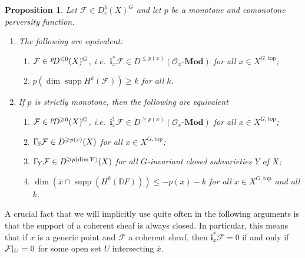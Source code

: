 \documentclass{compositio}
\theoremstyle{plain}
\newtheorem{Prop}[Thm]{Proposition}
\theoremstyle{definition}
\theoremstyle{remark}
\newcommand\sheaf{\mathcal}
\newcommand\sO{\sheaf{O}}
\newcommand\cat{\mathbf}
\newcommand\catModules[1]{#1\text{-}\cat{Mod}}
\newcommand\supp{\operatorname{supp}}
\newcommand\res[2]{\mathchoice{\left.#1\right|_{#2}}{#1|_{#2}}{#1|_{#2}}{#1|_{#2}}}
\newcommand\perv[1][p]{\mkern1mu{}^{#1}\mkern-3mu}
\newcommand\dualize{\mathbb D}
\newcommand\lc[1]{\Gamma_{\mkern-3mu#1}}
\newcommand\Xtop[1][X]{#1^{G,\mathrm{top}}}
\begin{document}
\begin{Prop}\label{prop:equivDeligneKashiwara}%
    Let $\sheaf F \in  D_c^b(X)^G$ and let $p$ be a monotone and comonotone perversity function.
    \begin{enumerate}
        \item \label{li:prop:equivDeligneKashiwara:le}%
            The following are equivalent:
            \begin{enumerate}
                \item \label{li:prop:equivDeligneKashiwara:le:1}%
                    $\sheaf F \in  \perv D^{\leq 0}(X)^G$, i.e.\ $\mathbf i_x^*\sheaf F \in  D^{\leq p(x)}(\catModules{\sO_x})$ for all $x \in  \Xtop$;
                \item \label{li:prop:equivDeligneKashiwara:le:2}%
                    $p(\dim \supp H^{k}(\sheaf F)) \geq  k$ for all $k$.
            \end{enumerate}
        \item \label{li:prop:equivDeligneKashiwara:ge}%
            If $p$ is strictly monotone, then the following are equivalent
            \begin{enumerate}
                \item \label{li:prop:equivDeligneKashiwara:ge:1}%
                    $\sheaf F \in  \perv D^{\ge 0}(X)^G$, i.e.\ $\mathbf i_x^!\sheaf F \in  D^{\geq p(x)}(\catModules{\sO_x})$ for all $x \in  \Xtop$;
                \item \label{li:prop:equivDeligneKashiwara:ge:2}%
                    $\lc {\overline x}\sheaf F \in  D^{\geq p(x)}(X)$ for all $x \in  \Xtop$;
                \item \label{li:prop:equivDeligneKashiwara:ge:3}%
                    $\lc {Y}\sheaf F \in  D^{\geq p(\dim Y)}(X)$ for all $G$-invariant closed subvarieties $Y$ of $X$;
                \item \label{li:prop:equivDeligneKashiwara:ge:4}%
                    $\dim\left( \overline x \cap  \supp\left( H^k(\dualize F) \right) \right) \leq  -p(x) - k$ for all $x \in  \Xtop$ and all $k$.
            \end{enumerate}
    \end{enumerate}
\end{Prop}

A crucial fact that we will implicitly use quite often in the following arguments is that the support of a coherent sheaf is always closed.
In particular, this means that if $x$ is a generic point and $\sheaf F$ a coherent sheaf, then $\mathbf i_x^* \sheaf F = 0$ if and only if $\res{\sheaf F}U = 0$ for some open set $U$ intersecting $\overline x$.
\end{document}
